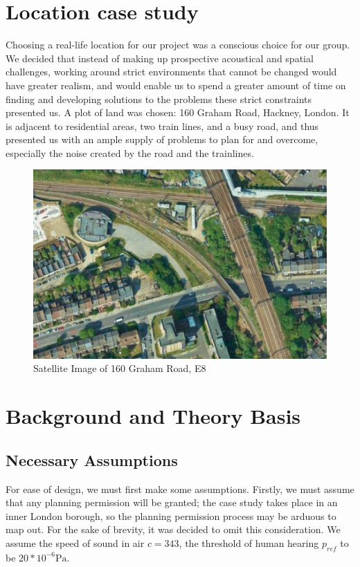 \documentclass[10pt, twocolumn]{article}
\begin{document}
    \section{Location case study}
        Choosing a real-life location for our project was a conscious choice for our group.
        We decided that instead of making up prospective acoustical and spatial challenges, working around strict environments that cannot be changed would have greater realism, and would enable us to spend a greater amount of time on finding and developing solutions to the problems these strict constraints presented us.
        A plot of land was chosen: 160 Graham Road, Hackney, London.
        It is adjacent to residential areas, two train lines, and a busy road, and thus presented us with an ample supply of problems to plan for and overcome, especially the noise created by the road and the trainlines.
        \begin{figure}[ht]
            \centering
            \centerline{\includegraphics[scale=0.5]{resources/160 Graham Road.png}}
            \caption{Satellite Image of 160 Graham Road, E8}
            \label{graham}
        \end{figure}
    \section{Background and Theory Basis}
        \subsection{Necessary Assumptions}
            For ease of design, we must first make some assumptions.
            Firstly, we must assume that any planning permission will be granted; the case study takes place in an inner London borough, so the planning permission process may be arduous to map out.
            For the sake of brevity, it was decided to omit this consideration.
            We assume the speed of sound in air $c=343$, the threshold of human hearing $p_{ref}$ to be $20*10^{-6}\si{\pascal}$.
\end{document}
